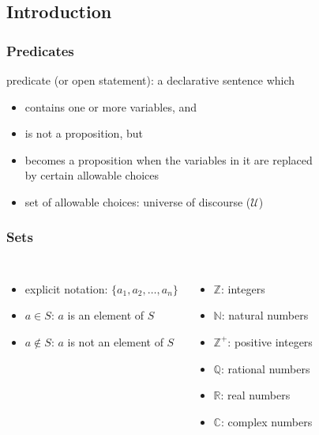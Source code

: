 \documentclass[dvipsnames]{beamer}
\begin{document}
\subsection{Introduction}

\begin{frame}
  \frametitle{Predicates}

  \begin{definition}
    \alert{predicate} (or \alert{open statement}): a declarative sentence which
    \begin{itemize}
      \item contains one or more variables, and
      \item is not a proposition, but
      \item becomes a proposition when the variables in it are replaced\\
        by certain allowable choices
    \end{itemize}
  \end{definition}

  \begin{itemize}
    \item set of allowable choices: \alert{universe of discourse} ($\mathcal{U}$)

  \end{itemize}
\end{frame}

\begin{frame}
  \frametitle{Sets}

  \begin{columns}[t]
    \begin{itemize}
      \item explicit notation: $\{a_1,a_2,\dots,a_n\}$

      \medskip
      \item $a \in S$: $a$ is an element of $S$
      \item $a \notin S$: $a$ is not an element of $S$
    \end{itemize}

    \pause
    \begin{itemize}
      \item $\mathbb{Z}$: integers
      \item $\mathbb{N}$: natural numbers
      \item $\mathbb{Z}^+$: positive integers
      \item $\mathbb{Q}$: rational numbers
      \item $\mathbb{R}$: real numbers
      \item $\mathbb{C}$: complex numbers
    \end{itemize}
  \end{columns}
\end{frame}
\end{document}
